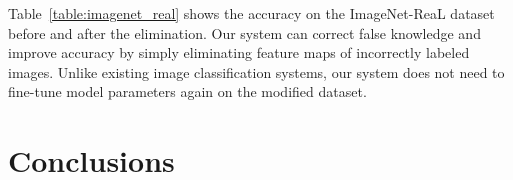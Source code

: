 \documentclass[runningheads]{llncs}
\begin{document}
Table~\ref{table:imagenet_real} shows the accuracy on the ImageNet-ReaL dataset before and after the elimination.
Our system can correct false knowledge and improve accuracy by simply eliminating feature maps of incorrectly labeled images.
Unlike existing image classification systems, our system does not need to fine-tune model parameters again on the modified dataset.


\begin{table}[t]
\caption{\textbf{Left}: validation accuracy on the ImageNet-ReaL dataset before and after eliminating incorrectly labeled images from the support sets.
         \textbf{Right}: the details for the support and query sets.}
\begin{minipage}{0.45\textwidth}
\centering
{}
\end{minipage}
\label{table:imagenet_real}
\begin{minipage}{0.45\textwidth}
\centering
{}
\end{minipage}
\end{table}


\section{Conclusions}
\end{document}
